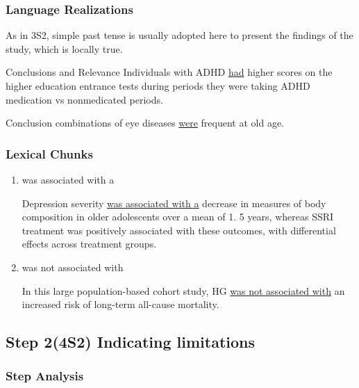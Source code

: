 \documentclass{ctexbook}
\begin{document}
    \subsubsection{Language Realizations}

    As in 3S2, simple past tense is usually adopted here to present the findings of the study, which is locally true.

    \begin{eg}{}
      Conclusions and Relevance Individuals with ADHD \uline{had} higher scores on the higher education entrance tests during periods they were taking ADHD medication vs nonmedicated periods.
    \end{eg}

    \begin{eg}{}
      Conclusion combinations of eye diseases \uline{were} frequent at old age. 
    \end{eg}

    \subsubsection{Lexical Chunks}

    \begin{enumerate}
      \item was associated with a
      \begin{eg}{}
        Depression severity \uline{was associated with a} decrease in measures of body composition in older adolescents over a mean of 1. 5 years, whereas SSRI treatment was positively associated with these outcomes, with differential effects across treatment groups.
      \end{eg}
      \item was not associated with
      \begin{eg}{}
        In this large population-based cohort study, HG \uline{was not associated with} an increased risk of long-term all-cause mortality.
      \end{eg}
    \end{enumerate}

  \subsection{Step 2(4S2) Indicating limitations}
    \subsubsection{Step Analysis}
\end{document}
